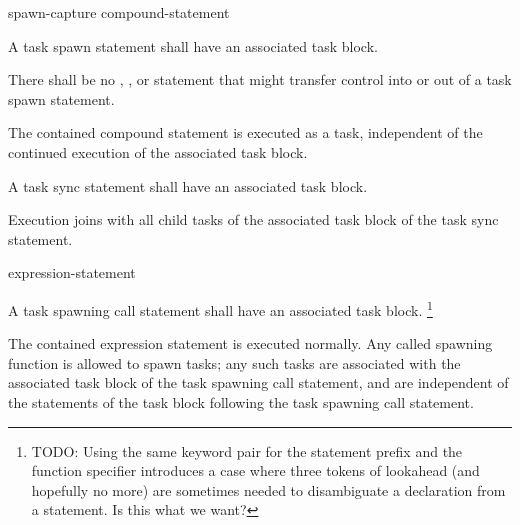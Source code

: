 
\begin{bnf}
\br
{}  spawn-capture\opt{} compound-statement
\end{bnf}


\pnum
A task spawn statement shall have an associated task block.

\pnum
There shall be no
,
,
or
statement that might transfer control into or out of
a task spawn statement.

\pnum
The contained compound statement is executed as a task,
independent of the continued execution
of the associated task block.


\begin{bnf}
\br
{}  \terminal{;}
\end{bnf}


\pnum
A task sync statement shall have an associated task block.

\pnum
Execution joins with
all child tasks of the associated task block
of the task sync statement.

\begin{bnf}
\br
{}  expression-statement
\end{bnf}

\pnum
A task spawning call statement shall have an associated task block.
\footnote{TODO:
Using the same keyword pair
for the statement prefix and the function specifier
introduces a case where three tokens of lookahead
(and hopefully no more)
are sometimes needed
to disambiguate a declaration from a statement.
Is this what we want?
}


\pnum
The contained expression statement is executed normally.
Any called spawning function is allowed to spawn tasks;
any such tasks are associated with the associated task block
of the task spawning call statement,
and are
independent of
the statements of the task block
following the task spawning call statement.

